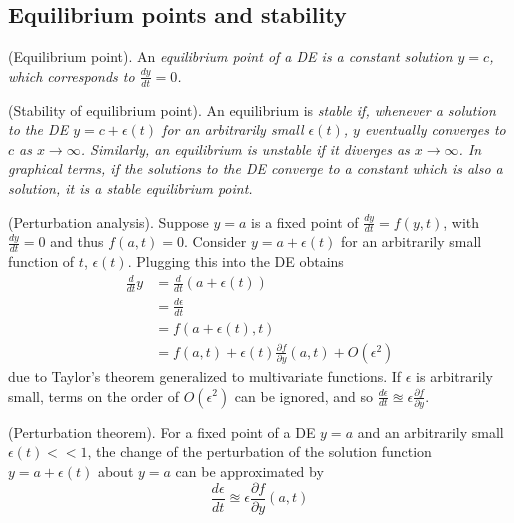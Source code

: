 \documentclass{article}
\begin{document}
\subsection{Equilibrium points and stability}
\begin{definition}
    (Equilibrium point). An \it equilibrium point \normalfont of a DE is a constant solution $y=c$, which corresponds to $\frac{dy}{dt} = 0$.
\end{definition}
\begin{definition}
    (Stability of equilibrium point). An equilibrium is \it stable \normalfont if, whenever a solution to the DE $y = c+\epsilon(t)$ for an arbitrarily small $\epsilon(t)$, $y$ eventually converges to $c$ as $x \to \infty$. Similarly, an equilibrium is \it unstable \normalfont if it diverges as $x \to \infty$. In graphical terms, if the solutions to the DE converge to a constant which is also a solution, it is a stable equilibrium point.
\end{definition}
\begin{method}
(Perturbation analysis). Suppose $y=a$ is a fixed point of $\frac{dy}{dt} = f(y,t)$, with $\frac{dy}{dt} = 0$ and thus $f(a,t) = 0$. Consider $y = a + \epsilon (t)$ for an arbitrarily small function of $t$, $\epsilon(t)$. Plugging this into the DE obtains
\begin{equation*}
    \begin{aligned}
        \frac{d}{dt} y &= \frac{d}{dt} (a + \epsilon(t)) \\
        &= \frac{d\epsilon}{dt} \\
        &= f(a+\epsilon(t), t) \\
        &= f(a,t) + \epsilon(t)\frac{\partial f}{\partial y}(a,t) + O(\epsilon^2)
    \end{aligned}
\end{equation*}
due to Taylor's theorem generalized to multivariate functions. If $\epsilon$ is arbitrarily small, terms on the order of $O(\epsilon^2)$ can be ignored, and so $\frac{d\epsilon}{dt} \approxeq \epsilon \frac{\partial f}{\partial y}$.
\end{method}
\begin{theorem}
    (Perturbation theorem). For a fixed point of a DE $y=a$ and an arbitrarily small $\epsilon(t) << 1$, the change of the perturbation of the solution function $y=a+\epsilon(t)$ about $y=a$ can be approximated by 
    \begin{equation*}
        \frac{d\epsilon}{dt} \approxeq \epsilon \frac{\partial f}{\partial y}(a, t)
    \end{equation*}
\end{theorem}
\end{document}
